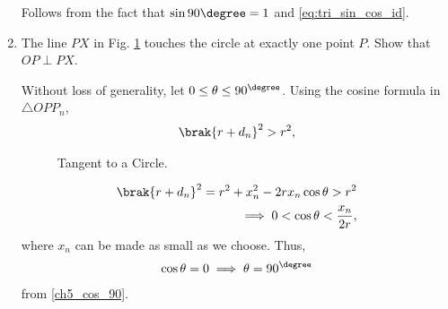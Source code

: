 \begin{enumerate}[label=\arabic*.,ref=\thesubsection.\theenumi]
\solution 
Follows from the fact that $\sin 90\degree = 1$ and \eqref{eq:tri_sin_cos_id}.



%
% 	
\item
	The line $PX$ in Fig. \ref{ch4_tangent_def} touches the circle at exactly one  point $P$. 
%
%
	Show that $OP \perp PX$.

\solution Without loss of generality, let $0 \le \theta \le 90^{\degree}$. Using the cosine formula in $\triangle OPP_n$,\begin{align}
\brak{r+d_n}^2 > r^2,
\end{align}
%
\begin{figure}[!ht]
	\begin{center}
		
		\resizebox{\columnwidth}{!}{}
	\end{center}
	\caption{Tangent to a Circle.}
	\label{ch4_tangent_def}	
\end{figure}
%
%		

%
\begin{align}
\brak{r+d_n}^2 = r^2 + x_n^2 - 2rx_n\cos\theta > r^2 
\\
\implies  0 <\cos\theta < \frac{x_n}{2r},
\end{align}
%
where $x_n$ can be made as small as we choose.  Thus, 
%
\begin{align}
\cos \theta = 0 \implies \theta  = 90 ^{\degree}
\end{align}
from \eqref{ch5_cos_90}.


\end{enumerate}
